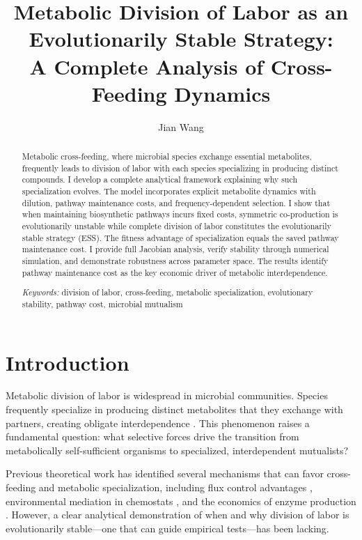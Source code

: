 \documentclass[11pt]{article}
\title{Metabolic Division of Labor as an Evolutionarily Stable Strategy:\\ A Complete Analysis of Cross-Feeding Dynamics}
\author{Jian Wang}
\date{}
\theoremstyle{definition}
\begin{document}
\maketitle

\begin{abstract}
Metabolic cross-feeding, where microbial species exchange essential metabolites, frequently leads to division of labor with each species specializing in producing distinct compounds. I develop a complete analytical framework explaining why such specialization evolves. The model incorporates explicit metabolite dynamics with dilution, pathway maintenance costs, and frequency-dependent selection. I show that when maintaining biosynthetic pathways incurs fixed costs, symmetric co-production is evolutionarily unstable while complete division of labor constitutes the evolutionarily stable strategy (ESS). The fitness advantage of specialization equals the saved pathway maintenance cost. I provide full Jacobian analysis, verify stability through numerical simulation, and demonstrate robustness across parameter space. The results identify pathway maintenance cost as the key economic driver of metabolic interdependence.

\bigskip
\noindent\textit{Keywords:} division of labor, cross-feeding, metabolic specialization, evolutionary stability, pathway cost, microbial mutualism
\end{abstract}

\section{Introduction}

Metabolic division of labor is widespread in microbial communities. Species frequently specialize in producing distinct metabolites that they exchange with partners, creating obligate interdependence \citep{morris2013black, mee2014syntrophic}. This phenomenon raises a fundamental question: what selective forces drive the transition from metabolically self-sufficient organisms to specialized, interdependent mutualists?

Previous theoretical work has identified several mechanisms that can favor cross-feeding and metabolic specialization, including flux control advantages \citep{yamagishi2016}, environmental mediation in chemostats \citep{fischer2019}, and the economics of enzyme production \citep{lynch2015evolutionary}. However, a clear analytical demonstration of when and why division of labor is evolutionarily stable---one that can guide empirical tests---has been lacking.
\end{document}

